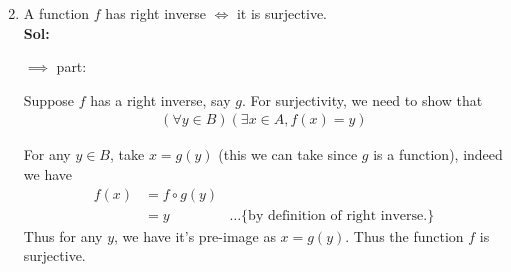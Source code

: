 \documentclass[xcolor=svgnames]{beamer}
\begin{document}
\begin{frame}{}
    \begin{enumerate}\setcounter{enumi}{1}
        \item A function $f$ has right inverse $\iff$ it is surjective.
    \\ \textbf{Sol:} 
    
    $\implies$ part:
    
    Suppose $f$ has a right inverse, say $g$. For surjectivity, we need to show that 
    \begin{align*}
     (\forall y \in B)  (\exists x \in A, f(x) = y)
    \end{align*}
    
    For any $y \in B$, take $x = g(y)$ (this we can take since $g$ is a function), indeed we have 
    \begin{align*}
        f(x) &= f \circ g(y) &
        \\ &= y & \ldots \text{\{ by definition of right inverse.\}}
    \end{align*}
    Thus for any $y$, we have it's pre-image as $x = g(y)$. Thus the function $f$ is surjective.
    \end{enumerate}

\end{frame}
\end{document}
